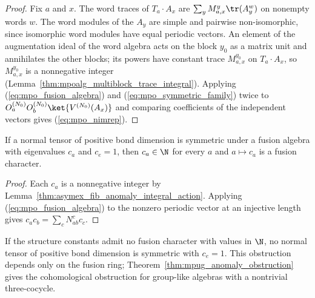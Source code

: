 \begin{proof}
    \leanok
    Fix $a$ and $x$. The word traces of $T_a\cdot A_x$ are
    $\sum_yM_{a,x}^y\tr(A_y^w)$ on nonempty words $w$. The word modules of
    the $A_y$ are simple and pairwise non-isomorphic, since isomorphic word
    modules have equal periodic vectors. An element of the augmentation ideal
    of the word algebra acts on the block $y_0$ as a matrix unit and
    annihilates the other blocks; its powers have constant trace
    $M_{a,x}^{y_0}$ on $T_a\cdot A_x$, so $M_{a,x}^{y_0}$ is a nonnegative
    integer (Lemma~\ref{thm:mpoalg_multiblock_trace_integral}). Applying
    (\ref{eq:mpo_fusion_algebra}) and (\ref{eq:mpo_symmetric_family}) twice
    to $O_a^{(N_0)}O_b^{(N_0)}\ket{V^{(N_0)}(A_x)}$ and comparing
    coefficients of the independent vectors gives (\ref{eq:mpo_nimrep}).
\end{proof}

\begin{lemma}%
    \label{thm:mpo_symmetric_character}
    \leanok
    If a normal tensor of positive bond dimension is symmetric under a fusion
    algebra with eigenvalues $c_a$ and $c_e=1$, then $c_a\in\N$ for every $a$
    and $a\mapsto c_a$ is a fusion character.
\end{lemma}

\begin{proof}
    \leanok
    Each $c_a$ is a nonnegative integer by
    Lemma~\ref{thm:asymex_fib_anomaly_integral_action}. Applying
    (\ref{eq:mpo_fusion_algebra}) to the nonzero periodic vector at an
    injective length gives $c_ac_b=\sum_cN_{ab}^cc_c$.
\end{proof}

\begin{corollary}%
    \label{cor:mpo_symmetric_no_go}
    \leanok
    If the structure constants admit no fusion character with values in
    $\N$, no normal tensor of positive bond dimension is symmetric with
    $c_e=1$. This obstruction depends only on the fusion ring;
    Theorem~\ref{thm:mpug_anomaly_obstruction} gives the cohomological
    obstruction for group-like algebras with a nontrivial three-cocycle.
\end{corollary}

